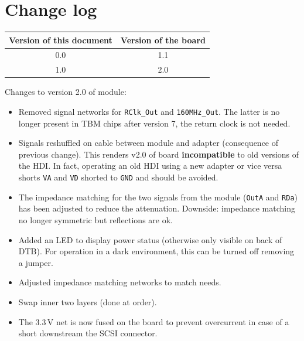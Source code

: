 \section{Change log}
\begin{tabular}{cc}
    \toprule
    Version of this document & Version of the board \\
    \midrule
    0.0 & 1.1 \\
    1.0 & 2.0 \\
    \bottomrule
\end{tabular}

\bigskip

Changes to version 2.0 of module:
\begin{itemize}
    \item Removed signal networks for \texttt{RClk\_Out} and \texttt{160MHz\_Out}. The latter is no longer present in TBM chips after version 7, the return clock is not needed.
    \item Signals reshuffled on cable between module and adapter (consequence of previous change). This renders v2.0 of board \textbf{incompatible} to old versions of the HDI. In fact, operating an old HDI using a new adapter or vice versa shorts \texttt{VA} and \texttt{VD} shorted to \texttt{GND} and should be avoided.
    \item The impedance matching for the two signals from the module (\texttt{OutA} and \texttt{RDa}) has been adjusted to reduce the attenuation. Downside: impedance matching no longer symmetric but reflections are ok.
    \item Added an LED to display power status (otherwise only visible on back of DTB). For operation in a dark environment, this can be turned off removing a jumper.
    \item Adjusted impedance matching networks to match needs.
    \item Swap inner two layers (done at order).
    \item The 3.3\,V net is now fused on the board to prevent overcurrent in case of a short downstream the SCSI connector.
\end{itemize}

